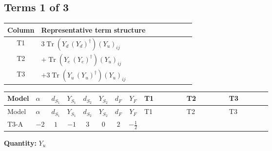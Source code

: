 \documentclass[8pt]{article}
\begin{document}
\begin{landscape}
\subsection*{Terms 1 of 3}
\begin{center}
\begin{tabular}{@{}c >{\raggedright\arraybackslash}p{0.82\linewidth}@{}}
\toprule
Column & Representative term structure \\
\midrule
T1 & \(\displaystyle 3 \operatorname{Tr}\!\left({Y_d}\,\left({Y_d}\right)^{\dagger}\right) \left({Y_u}\right)_{ij}\) \\
\midrule
T2 & \(\displaystyle +\operatorname{Tr}\!\left({Y_e}\,\left({Y_e}\right)^{\dagger}\right) \left({Y_u}\right)_{ij}\) \\
\midrule
T3 & \(\displaystyle +3 \operatorname{Tr}\!\left({Y_u}\,\left({Y_u}\right)^{\dagger}\right) \left({Y_u}\right)_{ij}\) \\
\midrule
\bottomrule
\end{tabular}
\end{center}
\smallskip
\tiny
\begin{longtable}{@{}llcccccc >{\raggedright\arraybackslash}p{0.21\linewidth} >{\raggedright\arraybackslash}p{0.21\linewidth} >{\raggedright\arraybackslash}p{0.21\linewidth}@{}}
\toprule
Model & $\alpha$ & $d_{S_1}$ & $Y_{S_1}$ & $d_{S_2}$ & $Y_{S_2}$ & $d_F$ & $Y_F$ & T1 & T2 & T3 \\
\midrule
\endfirsthead
\toprule
Model & $\alpha$ & $d_{S_1}$ & $Y_{S_1}$ & $d_{S_2}$ & $Y_{S_2}$ & $d_F$ & $Y_F$ & T1 & T2 & T3 \\
\midrule
\endhead
T3-A & $-2$ & $1$ & $-1$ & $3$ & $0$ & $2$ & $-\frac{1}{2}$ & \scriptsize\adjustbox{max width=\linewidth}{$\begin{gathered} 3 \operatorname{Tr}\!\left({Y_d}\,\left({Y_d}\right)^{\dagger}\right) \left({Y_u}\right)_{ij}\end{gathered}$} & \scriptsize\adjustbox{max width=\linewidth}{$\begin{gathered} +\operatorname{Tr}\!\left({Y_e}\,\left({Y_e}\right)^{\dagger}\right) \left({Y_u}\right)_{ij}\end{gathered}$} & \scriptsize\adjustbox{max width=\linewidth}{$\begin{gathered} +3 \operatorname{Tr}\!\left({Y_u}\,\left({Y_u}\right)^{\dagger}\right) \left({Y_u}\right)_{ij}\end{gathered}$} \\
\midrule
\bottomrule
\end{longtable}
\clearpage
\noindent\textbf{Quantity: }$Y_u$\par\smallskip

\end{landscape}
\end{document}
